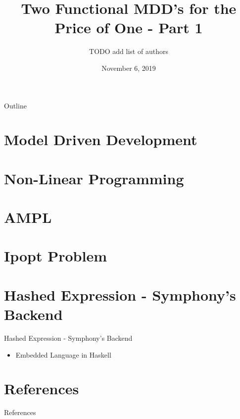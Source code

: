 \documentclass[presentation]{beamer}
\author{TODO add list of authors}
\date{November 6, 2019}
\title{Two Functional MDD's for the Price of One - Part 1}
\begin{document}
\maketitle
\begin{frame}{Outline}
\tableofcontents
\end{frame}


\section{Model Driven Development}
\label{sec:org88d7a74}
\section{Non-Linear Programming}
\label{sec:org211e09d}
\section{AMPL}
\label{sec:org6475ad1}
\section{Ipopt Problem}
\label{sec:org82fbfa2}
\section{Hashed Expression - Symphony's Backend}
\label{sec:org4161383}
\begin{frame}[label={sec:org8d1ba02}]{Hashed Expression - Symphony's Backend}
\begin{itemize}
\item Embedded Language in \alert{Haskell}
\end{itemize}
\end{frame}
\section{References}
\label{sec:orgf6ca104}
\begin{frame}[label={sec:orge83c1f4}]{References}
\printbibliography[heading=none]
\end{frame}
\end{document}

